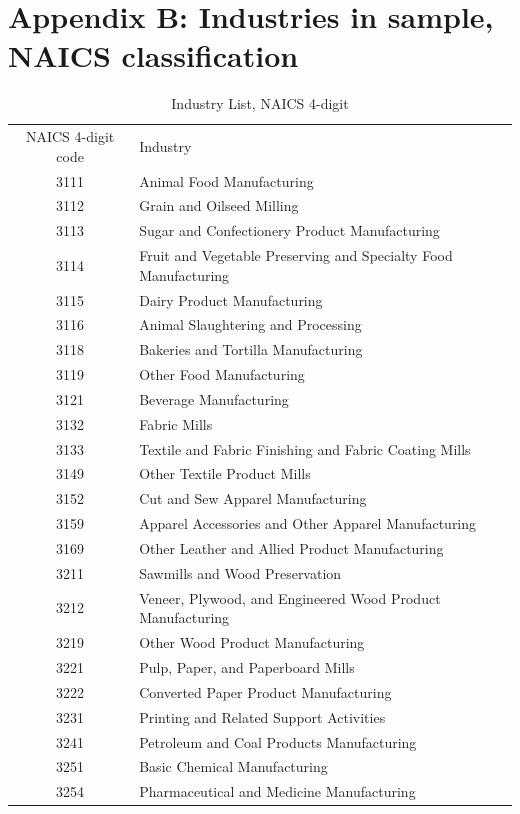 \section{Appendix B: Industries in sample, NAICS classification}
\begin{spacing}{1}
\begin{longtable}{cl}\caption{Industry List, NAICS 4-digit}\label{tab:naics4diglist}\\
NAICS 4-digit code & Industry \\
3111 &	Animal Food Manufacturing \\
3112 &	Grain and Oilseed Milling \\
3113 &	Sugar and Confectionery Product Manufacturing \\
3114 &	Fruit and Vegetable Preserving and Specialty Food Manufacturing \\
3115 &	Dairy Product Manufacturing \\
3116 &	Animal Slaughtering and Processing \\
3118 &	Bakeries and Tortilla Manufacturing \\
3119 &	Other Food Manufacturing \\
3121 &	Beverage Manufacturing \\
3132 &	Fabric Mills \\
3133 &	Textile and Fabric Finishing and Fabric Coating Mills \\
3149 &	Other Textile Product Mills \\
3152 &	Cut and Sew Apparel Manufacturing \\
3159 &	Apparel Accessories and Other Apparel Manufacturing \\
3169 &	Other Leather and Allied Product Manufacturing \\
3211 &	Sawmills and Wood Preservation \\
3212 &	Veneer, Plywood, and Engineered Wood Product Manufacturing \\
3219 &	Other Wood Product Manufacturing \\
3221 &	Pulp, Paper, and Paperboard Mills \\
3222 &	Converted Paper Product Manufacturing \\
3231 &	Printing and Related Support Activities \\
3241 &	Petroleum and Coal Products Manufacturing \\
3251 &	Basic Chemical Manufacturing \\
3254 &	Pharmaceutical and Medicine Manufacturing \\

\end{longtable}
\end{spacing}
